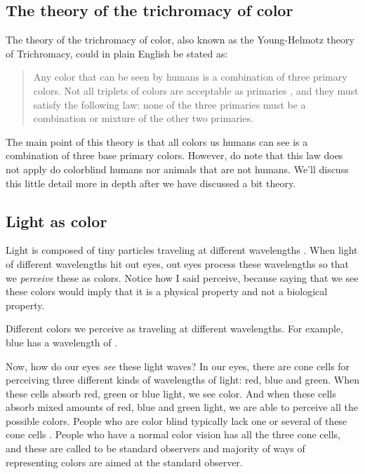 \subsection{The theory of the trichromacy of color}

The theory of the trichromacy of color, also known as the
Young-Helmotz theory of Trichromacy, could in plain English be stated
as: \cite{Cotton95colour,Pascale2003_ReviewRGBColourSpaces}

\begin{quote}
  Any color that can be seen by humans is a combination of three
  primary colors. Not all triplets of colors are acceptable as
  primaries , and they must satisfy the following law: none of the
  three primaries must be a combination or mixture of the other two
  primaries.
\end{quote}

The main point of this theory is that all colors us humans can see is
a combination of three base primary colors. However, do note that this
law does not apply do colorblind humans nor animals that are not
humans. We'll discuss this little detail more in depth after we have
discussed a bit theory.

\subsection{Light as color}

Light is composed of tiny particles traveling at different
wavelengths \cite{neider93:_openg_progr_guide}. When
light of different wavelengths hit out eyes, out eyes process these
wavelengths so that we \textit{perceive} these as colors. Notice how I
said perceive, because saying that we see these colors would imply
that it is a physical property and not a biological property.

Different colors we perceive as traveling at different
wavelengths. For example, blue has a wavelength of \bluewave
\cite{ohlsson99:_digit_bild_kreat}.

Now, how do our eyes \textit{see} these light waves? In our eyes,
there are cone cells for perceiving three different kinds of
wavelengths of light: red, blue and green. When these cells absorb
red, green or blue light, we see color. And when these cells absorb
mixed amounts of red, blue and green light, we are able to perceive
all the possible colors. People who are color blind typically lack one
or several of these cone cells
\cite{schanda97:_colorimetry,neider93:_openg_progr_guide}. People who
have a normal color vision has all the three cone cells, and these are
called to be standard observers and majority of ways of representing
colors are aimed at the standard observer.


